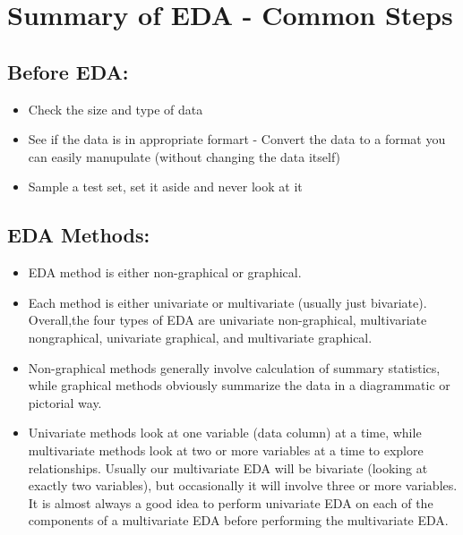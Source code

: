 \documentclass[openany]{book}
\begin{document}
\section{Summary of EDA - Common Steps}


\subsection{Before EDA:}

\begin{itemize}
    \item Check the size and type of data
    \item See if the data is in appropriate formart - Convert the data to a format you can easily manupulate (without changing the data itself)
    \item Sample a test set, set it aside and never look at it
\end{itemize}



\subsection{EDA Methods:}

\begin{itemize}
    \item EDA method is either non-graphical or graphical.
    
    \item Each method is either univariate or multivariate (usually just bivariate). Overall,the four types of EDA are univariate non-graphical, multivariate nongraphical, univariate graphical, and multivariate graphical.
    
    \item Non-graphical methods generally involve calculation of summary statistics, while graphical methods obviously summarize the data in a diagrammatic or pictorial way.

    \item Univariate methods look at one variable (data column) at a time, while multivariate methods look at two or more variables at a time to explore relationships. Usually our multivariate EDA will be bivariate (looking at exactly two variables), but occasionally it will involve three or more variables. It is almost always a good idea to perform univariate EDA on each of the components of a multivariate EDA before performing the multivariate EDA.

\end{itemize}
\end{document}
